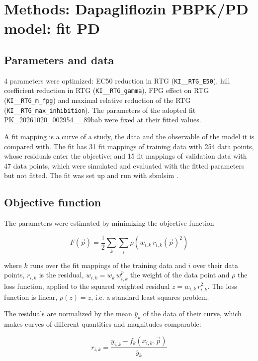 \section{Methods: Dapagliflozin PBPK/PD model: fit PD}

\subsection{Parameters and data}

4 parameters were optimized: EC50 reduction in RTG (\texttt{KI\_\_RTG\_E50}), hill coefficient reduction in RTG (\texttt{KI\_\_RTG\_gamma}), FPG effect on RTG (\texttt{KI\_\_RTG\_m\_fpg}) and maximal relative reduction of the RTG (\texttt{KI\_\_RTG\_max\_inhibition}). The parameters of the adopted fit PK\_20261020\_002954\_\_89bab were fixed at their fitted values.

A fit mapping is a curve of a study, the data and the observable of the model it is compared with. The fit has 31 fit mappings of training data with 254 data points, whose residuals enter the objective; and 15 fit mappings of validation data with 47 data points, which were simulated and evaluated with the fitted parameters but not fitted. The fit was set up and run with sbmlsim \cite{Koenig2026_sbmlsim}.

\subsection{Objective function}

The parameters were estimated by minimizing the objective function

\begin{equation}
F(\vec{p}) = \frac{1}{2} \sum_{k} \sum_{i} \rho\left(w_{i,k}\, r_{i,k}(\vec{p})^2\right)
\end{equation}

where $k$ runs over the fit mappings of the training data and $i$ over their data points, $r_{i,k}$ is the residual, $w_{i,k} = w_k\, w^{p}_{i,k}$ the weight of the data point and $\rho$ the loss function, applied to the squared weighted residual $z = w_{i,k}\, r_{i,k}^2$. The loss function is linear, $\rho(z) = z$, i.e. a standard least squares problem.

The residuals are normalized by the mean $\overline{y}_k$ of the data of their curve, which makes curves of different quantities and magnitudes comparable:

\begin{equation}
r_{i,k} = \frac{y_{i,k} - f_k(x_{i,k}, \vec{p})}{\overline{y}_k}
\end{equation}

